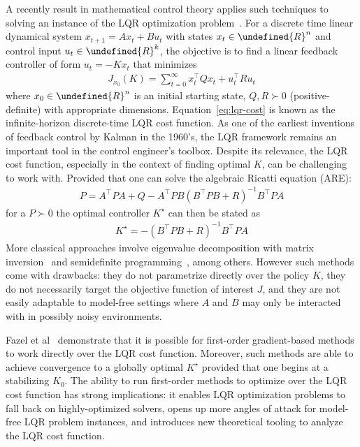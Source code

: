 \documentclass[11pt]{article}  %
\let\mbb\undefined
\newcommand{\mbb}[1]{\mathbb{#1}}
\begin{document}
A recently result in mathematical control theory applies
such techniques to solving an instance of
the LQR optimization problem~\cite{fazel2018global}.
For a discrete time linear dynamical system
\(x_{t + 1} = A x_t + B u_t\) with
states \(x_t \in \mbb{R}^n\) and control input \(u_t \in \mbb{R}^k\),
the objective is to find a linear feedback controller of form
\(u_t = - K x_t\) that minimizes
\begin{align}
  J_{x_0} (K) = \sum_{t = 0}^{\infty} x_t ^\top Q x_t + u_t ^\top R u_t
  \label{eq:lqr-cost}
\end{align}
where \(x_0 \in \mbb{R}^n\) is an initial starting state,
\(Q, R \succ 0\) (positive-definite) with appropriate dimensions.
Equation~\ref{eq:lqr-cost} is known as the
infinite-horizon discrete-time LQR cost function.
As one of the earliest inventions of feedback control by Kalman in the 1960's,
the LQR framework remains an important tool in the
control engineer's toolbox.
Despite its relevance, the LQR cost function,
especially in the context of finding optimal \(K\),
can be challenging to work with.
Provided that one can solve the algebraic Ricatti equation (ARE):
\begin{align}
  P = A^\top P A + Q - A^\top P B (B^\top P B + R)^{-1} B^\top P A
  \label{eq:p-are}
\end{align}
for a \(P \succ 0\)
the optimal controller \(K^\star\) can then be stated as
\begin{align}
  K^\star = - (B^\top P B + R)^{-1} B^\top P A
\end{align}
More classical approaches involve
eigenvalue decomposition with matrix inversion~\cite{lancaster1995algebraic} and
semidefinite programming~\cite{balakrishnan2003semidefinite},
among others.
However such methods come with drawbacks:
they do not parametrize directly over the policy \(K\),
they do not necessarily target the objective function of interest \(J\),
and they are not easily adaptable to model-free settings
where \(A\) and \(B\) may only be interacted with
in possibly noisy environments.

Fazel et al~\cite{fazel2018global} demonstrate that it is possible for
first-order gradient-based methods to work directly over
the LQR cost function.
Moreover, such methods are able to achieve convergence to a globally optimal
\(K^\star\) provided that one begins at a stabilizing \(K_0\).
The ability to run first-order methods to optimize over the LQR cost function
has strong implications:
it enables LQR optimization problems to fall back on
highly-optimized solvers,
opens up more angles of attack for model-free LQR problem instances,
and introduces new theoretical tooling to analyze the LQR cost function.
\end{document}
